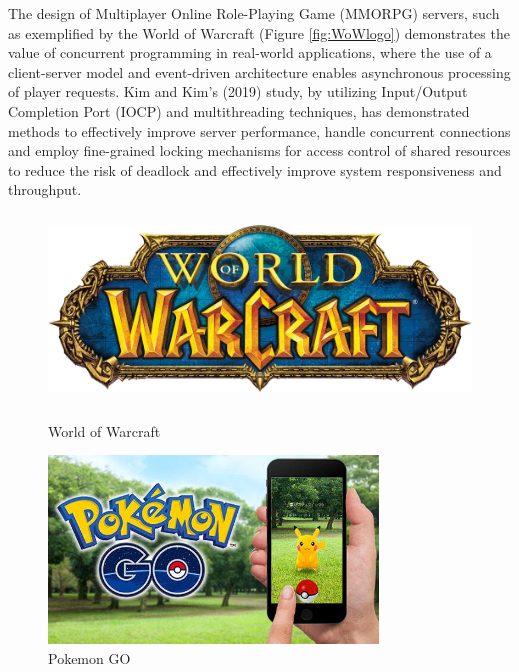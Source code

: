 \documentclass{l4proj}
\begin{document}
The design of Multiplayer Online Role-Playing Game (MMORPG) servers, such as exemplified by the World of Warcraft (Figure \ref{fig:WoWlogo}) demonstrates the value of concurrent programming in real-world applications, where the use of a client-server model and event-driven architecture enables asynchronous processing of player requests. Kim and Kim's (2019) study, by utilizing Input/Output Completion Port (IOCP) and multithreading techniques, has demonstrated methods to effectively improve server performance, handle concurrent connections and employ fine-grained locking mechanisms for access control of shared resources to reduce the risk of deadlock and effectively improve system responsiveness and throughput.

\begin{figure}[h]
    \centering
    \begin{minipage}[t]{0.35\textwidth}
        \centering
        \includegraphics[width=\linewidth,height=5cm,keepaspectratio]{images/WoWlogo.png}
        \caption{World of Warcraft}
        \label{fig:WoWlogo}
    \end{minipage}
    \quad
    \begin{minipage}[t]{0.30\textwidth}
        \centering
        \includegraphics[width=\linewidth,height=5cm,keepaspectratio]{images/PokemonGo.jpeg}
        \caption{Pokemon GO}
        \label{fig:PokemonGo}
    \end{minipage}
\end{figure}
\end{document}
